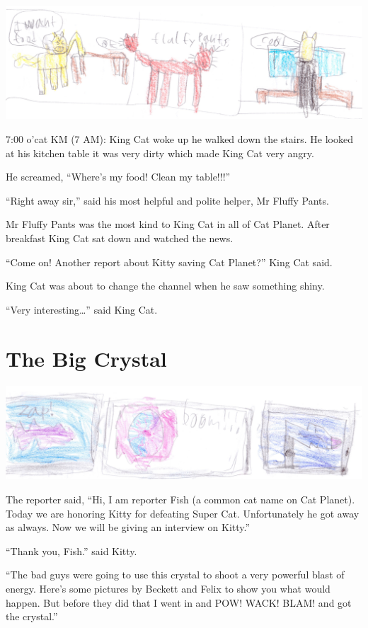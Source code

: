 \documentclass[12pt,oneside]{krantz}
\begin{document}
\includegraphics{img/fluffypants.jpg}

7:00 o'cat KM (7 AM): King Cat woke up he walked down the stairs. He
looked at his kitchen table it was very dirty which made King Cat very
angry.

He screamed, ``Where's my food! Clean my table!!!''

``Right away sir,'' said his most helpful and polite helper, Mr Fluffy
Pants.

Mr Fluffy Pants was the most kind to King Cat in all of Cat Planet.
After breakfast King Cat sat down and watched the news.

``Come on! Another report about Kitty saving Cat Planet?'' King Cat
said.

King Cat was about to change the channel when he saw something shiny.

``Very interesting\ldots{}'' said King Cat.

\hypertarget{the-big-crystal}{%
\chapter{The Big Crystal}\label{the-big-crystal}}

\includegraphics{img/boom.jpg}

The reporter said, ``Hi, I am reporter Fish (a common cat name on Cat
Planet). Today we are honoring Kitty for defeating Super Cat.
Unfortunately he got away as always. Now we will be giving an interview
on Kitty.''

``Thank you, Fish.'' said Kitty.

``The bad guys were going to use this crystal to shoot a very powerful
blast of energy. Here's some pictures by Beckett and Felix to show you
what would happen. But before they did that I went in and POW! WACK!
BLAM! and got the crystal.''
\end{document}
